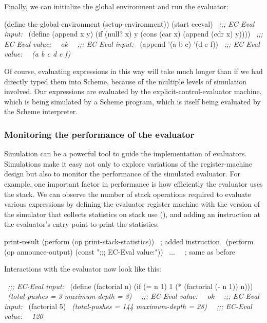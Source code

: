 \noindent
Finally, we can initialize the global environment and run the evaluator:

\begin{codeBlock}
(define the-global-environment (setup-environment))
(start eceval)
~\textit{;;; EC-Eval input:}~
(define (append x y)
  (if (null? x) y (cons (car x) (append (cdr x) y))))
~\textit{;;; EC-Eval value:}~
~\textit{ok}~
~\textit{;;; EC-Eval input:}~
(append '(a b c) '(d e f))
~\textit{;;; EC-Eval value:}~
~\textit{(a b c d e f)}~
\end{codeBlock}

\noindent
Of course, evaluating expressions in this way will take much longer than if we
had directly typed them into Scheme, because of the multiple levels of
simulation involved.  Our expressions are evaluated by the
explicit-control-evaluator machine, which is being simulated by a Scheme
program, which is itself being evaluated by the Scheme interpreter.

\subsubsection*{Monitoring the performance of the evaluator}

Simulation can be a powerful tool to guide the implementation of evaluators.
Simulations make it easy not only to explore variations of the register-machine
design but also to monitor the performance of the simulated evaluator.  For
example, one important factor in performance is how efficiently the evaluator
uses the stack.  We can observe the number of stack operations required to
evaluate various expressions by defining the evaluator register machine with
the version of the simulator that collects statistics on stack use
(), and adding an instruction at the evaluator's 
entry point to print the statistics:

\begin{codeBlock}
print-result
  (perform (op print-stack-statistics))   ~\textrm{; added instruction}~
  (perform
   (op announce-output) (const ";;; EC-Eval value:"))
  ~\( \dots \)~ ~\textrm{; same as before}~
\end{codeBlock}

\noindent
Interactions with the evaluator now look like this:

\begin{codeBlock}
~\textit{;;; EC-Eval input:}~
(define (factorial n)
  (if (= n 1) 1 (* (factorial (- n 1)) n)))
~\textit{(total-pushes = 3 maximum-depth = 3)}~
~\textit{;;; EC-Eval value:}~
~\textit{ok}~
~\textit{;;; EC-Eval input:}~
(factorial 5)
~\textit{(total-pushes = 144 maximum-depth = 28)}~
~\textit{;;; EC-Eval value:}~
~\textit{120}~
\end{codeBlock}


